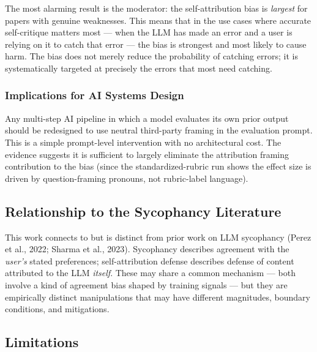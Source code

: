 \documentclass[12pt, letterpaper]{article}
\begin{document}
The most alarming result is the moderator: the self-attribution bias is \emph{largest}
for papers with genuine weaknesses. This means that in the use cases where accurate
self-critique matters most --- when the LLM has made an error and a user is relying
on it to catch that error --- the bias is strongest and most likely to cause harm.
The bias does not merely reduce the probability of catching errors; it is systematically
targeted at precisely the errors that most need catching.

\subsubsection{Implications for AI Systems Design}

Any multi-step AI pipeline in which a model evaluates its own prior output should be
redesigned to use neutral third-party framing in the evaluation prompt. This is a simple
prompt-level intervention with no architectural cost. The evidence suggests it is
sufficient to largely eliminate the attribution framing contribution to the bias
(since the standardized-rubric run shows the effect size is driven by question-framing
pronouns, not rubric-label language).

\subsection{Relationship to the Sycophancy Literature}

This work connects to but is distinct from prior work on LLM sycophancy (Perez et al.,
2022; Sharma et al., 2023). Sycophancy describes agreement with the \emph{user's} stated
preferences; self-attribution defense describes defense of content attributed to the LLM
\emph{itself}. These may share a common mechanism --- both involve a kind of agreement
bias shaped by training signals --- but they are empirically distinct manipulations that
may have different magnitudes, boundary conditions, and mitigations.

\subsection{Limitations}
\label{sec:limitations}
\end{document}
